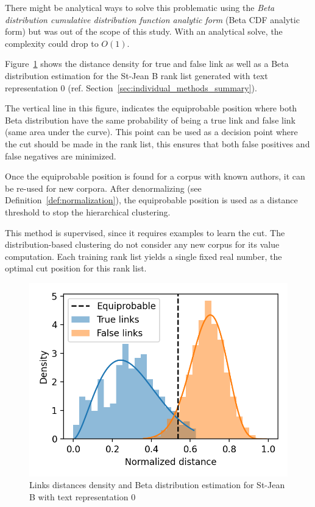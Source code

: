 There might be analytical ways to solve this problematic using the \textit{Beta distribution cumulative distribution function analytic form} (Beta CDF analytic form) but was out of the scope of this study.
With an analytical solve, the complexity could drop to $O(1)$.

Figure~\ref{fig:links_score_density} shows the distance density for true and false link as well as a Beta distribution estimation for the St-Jean B rank list generated with text representation 0 (ref. Section~\ref{sec:individual_methods_summary}).

The vertical line in this figure, indicates the equiprobable position where both Beta distribution have the same probability of being a true link and false link (same area under the curve).
This point can be used as a decision point where the cut should be made in the rank list, this ensures that both false positives and false negatives are minimized.

Once the equiprobable position is found for a corpus with known authors, it can be re-used for new corpora.
After denormalizing (see Definition~\ref{def:normalization}), the equiprobable position is used as a distance threshold to stop the hierarchical clustering.

This method is supervised, since it requires examples to learn the cut.
The distribution-based clustering do not consider any new corpus for its value computation.
Each training rank list yields a single fixed real number, the optimal cut position for this rank list.

\begin{figure}[!t]
  \caption{Links distances density and Beta distribution estimation for St-Jean B with text representation 0}
  \label{fig:links_score_density}
  \includegraphics[width=\linewidth]{img/links_score_density.png}
\end{figure}

